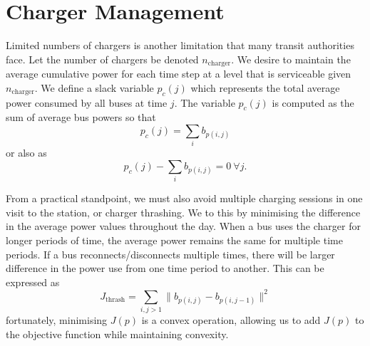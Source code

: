 \section{Charger Management}
\par Limited numbers of chargers is another limitation that many transit authorities face.  Let the number of chargers be denoted $n_{\text{charger}}$. We desire to maintain the average cumulative power for each time step at a level that is serviceable given $n_{\text{charger}}$. We define a slack variable $p_c(j)$ which represents the total average power consumed by all buses at time $j$.  The variable $p_c(j)$ is computed as the sum of average bus powers so that
\begin{equation*}
	p_c(j) = \sum_ib_{p(i,j)}
\end{equation*}
or also as 
\begin{equation}
p_c(j) - \sum_ib_{p(i,j)}  = 0\ \forall j.
\end{equation}
\par From a practical standpoint, we must also avoid multiple charging sessions in one visit to the station, or charger thrashing. We to this by minimising the difference in the average power values throughout the day.  When a bus uses the charger for longer periods of time, the average power remains the same for multiple time periods.  If a bus reconnects/disconnects multiple times, there will be larger difference in the power use from one time period to another. This can be expressed as
\begin{equation}
	J_{\text{thrash}} = \sum_{i,j > 1} \lVert b_{p(i,j)} - b_{p(i,j-1)}\rVert^2 
\end{equation}
fortunately, minimising $J(p)$ is a convex operation, allowing us to add $J(p)$ to the objective function while maintaining convexity.

